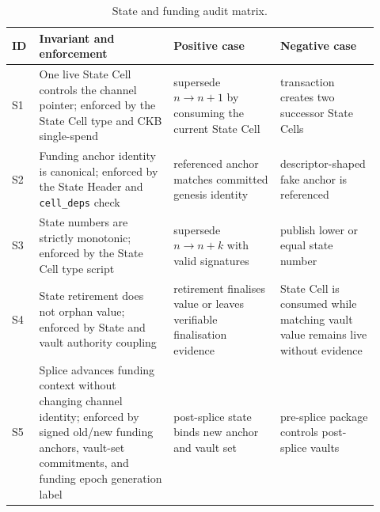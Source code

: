\documentclass[a4paper,11pt]{article}
\begin{document}
\begin{table}[H]
\centering
\footnotesize
\setlength{\tabcolsep}{4pt}
\begin{tabular}{L{0.06\linewidth}L{0.34\linewidth}L{0.27\linewidth}L{0.25\linewidth}}
\toprule
ID & Invariant and enforcement & Positive case & Negative case \\
\midrule
S1 & One live State Cell controls the channel pointer; enforced by the State Cell type and CKB single-spend & supersede $n \rightarrow n+1$ by consuming the current State Cell & transaction creates two successor State Cells \\
S2 & Funding anchor identity is canonical; enforced by the State Header and \texttt{cell\_deps} check & referenced anchor matches committed genesis identity & descriptor-shaped fake anchor is referenced \\
S3 & State numbers are strictly monotonic; enforced by the State Cell type script & supersede $n \rightarrow n+k$ with valid signatures & publish lower or equal state number \\
S4 & State retirement does not orphan value; enforced by State and vault authority coupling & retirement finalises value or leaves verifiable finalisation evidence & State Cell is consumed while matching vault value remains live without evidence \\
S5 & Splice advances funding context without changing channel identity; enforced by signed old/new funding anchors, vault-set commitments, and funding epoch generation label & post-splice state binds new anchor and vault set & pre-splice package controls post-splice vaults \\
\bottomrule
\end{tabular}
\caption{State and funding audit matrix.}
\label{tab:audit-state-funding}
\end{table}
\end{document}
